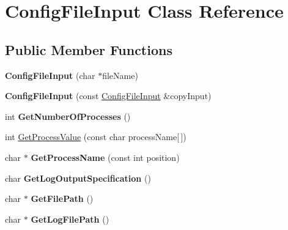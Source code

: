 \hypertarget{class_config_file_input}{}\section{Config\+File\+Input Class Reference}
\label{class_config_file_input}
\subsection*{Public Member Functions}
\begin{DoxyCompactItemize}
\item 
{\bfseries Config\+File\+Input} (char $\ast$file\+Name)\hypertarget{class_config_file_input_a5b6ab2074273bc9617fbc31dfa9ec1a9}{}\label{class_config_file_input_a5b6ab2074273bc9617fbc31dfa9ec1a9}

\item 
{\bfseries Config\+File\+Input} (const \hyperlink{class_config_file_input}{Config\+File\+Input} \&copy\+Input)\hypertarget{class_config_file_input_acb6a962a5a02bacadafcb454b866afb6}{}\label{class_config_file_input_acb6a962a5a02bacadafcb454b866afb6}

\item 
int {\bfseries Get\+Number\+Of\+Processes} ()\hypertarget{class_config_file_input_a58a7e540964501de1cc7c5b1dd46e1e3}{}\label{class_config_file_input_a58a7e540964501de1cc7c5b1dd46e1e3}

\item 
int \hyperlink{class_config_file_input_acc67c518509dd65e79b0b3781ad14f91}{Get\+Process\+Value} (const char process\+Name\mbox{[}$\,$\mbox{]})
\item 
char $\ast$ {\bfseries Get\+Process\+Name} (const int position)\hypertarget{class_config_file_input_aedf743487e75ba4a319c10ef6a3a4d6c}{}\label{class_config_file_input_aedf743487e75ba4a319c10ef6a3a4d6c}

\item 
char {\bfseries Get\+Log\+Output\+Specification} ()\hypertarget{class_config_file_input_ab912e1b4898d643e229c8093113eeeb7}{}\label{class_config_file_input_ab912e1b4898d643e229c8093113eeeb7}

\item 
char $\ast$ {\bfseries Get\+File\+Path} ()\hypertarget{class_config_file_input_aa9d2fba6514a5100922e6bddb4e2aaf5}{}\label{class_config_file_input_aa9d2fba6514a5100922e6bddb4e2aaf5}

\item 
char $\ast$ {\bfseries Get\+Log\+File\+Path} ()\hypertarget{class_config_file_input_aed8b12496389a14b9ffe831f9d830e2f}{}\label{class_config_file_input_aed8b12496389a14b9ffe831f9d830e2f}

\end{DoxyCompactItemize}
